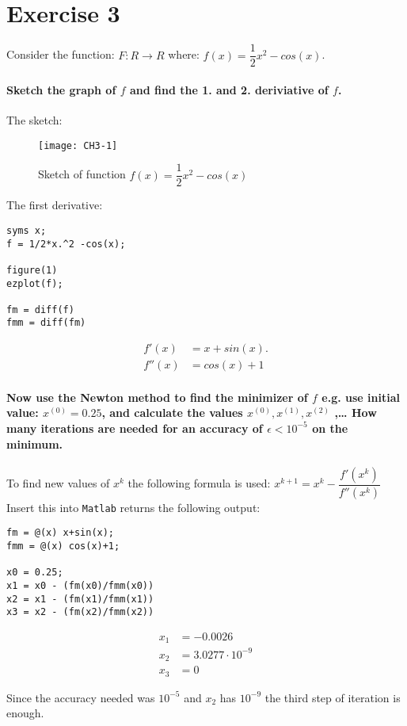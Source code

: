 \documentclass[Main]{subfiles}
\begin{document}
\section*{Exercise 3}
Consider the function: $F:R \rightarrow R$ where: $f(x) = \dfrac{1}{2}x^2 - cos(x)$.

\paragraph{Sketch the graph of $f$ and find the 1. and 2. deriviative of $f$.}

The sketch:

\begin{figure}[hbtp]
\centering
\texttt{[image: CH3-1]}
\vspace{-15pt}
\caption{Sketch of function $f(x) = \dfrac{1}{2}x^2 - cos(x)$}
\label{fig:ch3-1}
\end{figure}

The first derivative:
\begin{lstlisting}[caption=Derivatives and plot, style=Code-Matlab, label=lst:CH3-1]
syms x;
f = 1/2*x.^2 -cos(x);

figure(1)
ezplot(f);

fm = diff(f)
fmm = diff(fm)
\end{lstlisting}
\begin{align*}
f'(x) &= x+ sin(x).\\
f''(x) &= cos(x) + 1
\end{align*}

\paragraph{Now use the Newton method to find the minimizer of $f$ e.g. use initial value: $x^{(0)} = 0.25$, and calculate the values $x^{(0)}, x^{(1)}, x^{(2)}$ ,\dots 
How many iterations are needed for an accuracy of $\epsilon < 10^{-5}$  on
the minimum.} 

To find new values of $x^{k}$ the following formula is used: $x^{k+1} = x^k - \dfrac{f'(x^k)}{f''(x^k)}$
Insert this into \texttt{Matlab} returns the following output:

\begin{lstlisting}[caption=Newton's Method, style=Code-Matlab, label=lst:CH3-2]
fm = @(x) x+sin(x);
fmm = @(x) cos(x)+1;

x0 = 0.25;
x1 = x0 - (fm(x0)/fmm(x0))
x2 = x1 - (fm(x1)/fmm(x1))
x3 = x2 - (fm(x2)/fmm(x2))
\end{lstlisting}

\begin{align*}
x_1 &= -0.0026 \\
x_2 &= 3.0277 \cdot 10^{-9} \\
x_3 &= 0
\end{align*}

Since the accuracy needed was $10^{-5}$ and $x_2$ has $10^{-9}$ the third step of iteration is enough.
\end{document}
